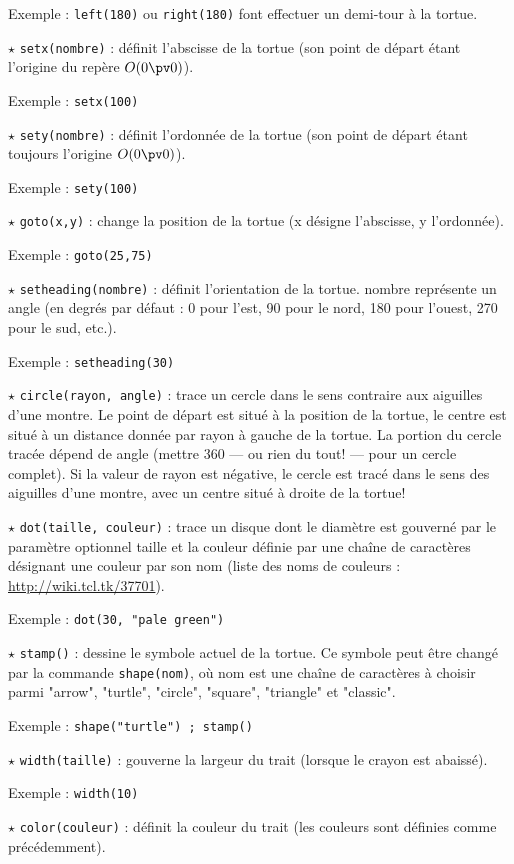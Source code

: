 Exemple : \verb!left(180)! ou \verb!right(180)! font effectuer un demi-tour à la tortue.

$\star$ \verb!setx(nombre)! : définit l'abscisse de la tortue (son point de départ étant l'origine du repère $O(0\pv 0)$).

Exemple : \verb!setx(100)!

$\star$ \verb!sety(nombre)! : définit l'ordonnée de la tortue (son point de départ étant toujours l'origine $O(0\pv 0)$).

Exemple : \verb!sety(100)!

$\star$ \verb!goto(x,y)! : change la position de la tortue (x désigne l'abscisse, y l'ordonnée).

Exemple : \verb!goto(25,75)!

$\star$ \verb!setheading(nombre)! : définit l'orientation de la tortue. nombre représente un angle (en degrés
par défaut : 0 pour l'est, 90 pour le nord, 180 pour l'ouest, 270 pour le sud, etc.).

Exemple : \verb!setheading(30)!

$\star$ \verb!circle(rayon, angle)! : trace un cercle dans le sens contraire aux aiguilles d'une montre. Le
point de départ est situé à la position de la tortue, le centre est situé à un distance donnée
par rayon à gauche de la tortue. La portion du cercle tracée dépend de angle (mettre 360
— ou rien du tout! — pour un cercle complet). Si la valeur de rayon est négative, le cercle est
tracé dans le sens des aiguilles d'une montre, avec un centre situé à droite de la tortue!

$\star$ \verb!dot(taille, couleur)! : trace un disque dont le diamètre est gouverné par le paramètre optionnel
taille et la couleur définie par une chaîne de caractères désignant une couleur par son
nom (liste des noms de couleurs : \url{http://wiki.tcl.tk/37701}).

Exemple : \verb!dot(30, "pale green")! 

$\star$ \verb!stamp()! : dessine le symbole actuel de la tortue. Ce symbole peut être changé par la commande
\verb!shape(nom)!, où nom est une chaîne de caractères à choisir parmi "arrow", "turtle", "circle",
"square", "triangle" et "classic".

Exemple : \verb!shape("turtle") ; stamp()!

$\star$ \verb!width(taille)! : gouverne la largeur du trait (lorsque le crayon est abaissé).

Exemple : \verb!width(10)!

$\star$ \verb!color(couleur)! : définit la couleur du trait (les couleurs sont définies comme précédemment).

